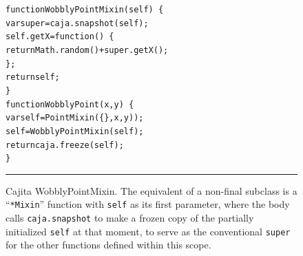 \documentclass[letterpaper,twocolumn,10pt]{article}
\newcommand{\code}[1]{{\tt {#1}}}              %
\begin{document}
\begin{figure}[t!]
\begin{alltt}
function WobblyPointMixin(self)\ \{
  var super = caja.snapshot(self);
  self.getX = function()\ \{ 
    return Math.random() + super.getX(); 
  \};
  return self;
\}
function WobblyPoint(x, y)\ \{
  var self = PointMixin(\{\}, x, y));
  self = WobblyPointMixin(self);
  return caja.freeze(self);
\}
\end{alltt}

\caption[Cajita WobblyPointMixin.]{Cajita WobblyPointMixin. The equivalent of 
a non-final subclass is a ``\code{*Mixin}'' function with \code{self} as its 
first parameter, where the body calls \code{caja.snapshot} to make a frozen 
copy of the partially initialized \code{self} at that moment, to serve as the 
conventional \code{super} for the other functions defined within this scope. 
\\ } \hrule
\label{fig:cajita-super-wobbly-point} 
\end{figure}
\end{document}
